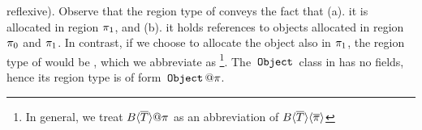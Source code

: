 reflexive). Observe that the region type of  conveys
the fact that (a). it is allocated in region $\pi_1$, and (b). it
holds references to objects allocated in region $\pi_0$ and $\pi_1$.
In contrast, if we choose to allocate the  object also in
$\pi_1$, the region type of  would be
, which we abbreviate
as \footnote{In general, we treat
$B\inang{\tbar}@\rgn$ as an abbreviation of
$B\langle \overline{T} \rangle\langle \overline{\pi} \rangle$}. The $\,{\tt Object}\,$ class in \FB has no
fields, hence its region type is of form $\ObjZ@\rgn$.



